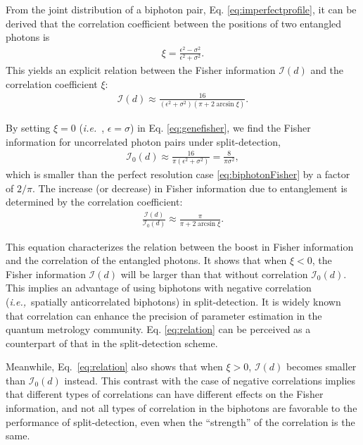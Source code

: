 From the joint distribution of a biphoton pair, Eq. \eqref{eq:imperfectprofile}, it can be derived that the correlation coefficient between the positions of two entangled photons is
\begin{align}\label{eq:genefisher}
	\xi=\frac{\epsilon ^2-\sigma ^2}{\epsilon ^2+\sigma ^2}.
\end{align}
This yields an explicit relation between the Fisher information $\mathcal{I}(d)$ and the correlation coefficient $\xi$:
\begin{align}\label{eq:Fisherinfosplit}
	\mathcal{I}(d)\approx\frac{16}{\left(\epsilon ^2+\sigma ^2\right) \left(\pi+2 \arcsin\xi \right)}.
\end{align}

By setting $\xi=0$ (\emph{i.e.}~, $\epsilon=\sigma$) in Eq. \eqref{eq:genefisher}, we find the Fisher information for uncorrelated photon pairs under split-detection,
\begin{align}\label{eq:splitUncorrelatedFisher}
	\mathcal{I}_0(d)\approx\frac{16}{\pi\left(\epsilon ^2+\sigma ^2\right)}=\frac{8}{\pi\sigma^2},
\end{align}
which is smaller than the perfect resolution case \eqref{eq:biphotonFisher} by a factor of $2/\pi$.
The increase (or decrease) in Fisher information due to entanglement is determined by the correlation coefficient:
\begin{align}\label{eq:relation}
	\frac{\mathcal{I}(d)}{\mathcal{I}_0(d)}\approx\frac{\pi}{\pi+2 \arcsin\xi }.
\end{align}

This equation characterizes the relation between the boost in Fisher information and the correlation of the entangled photons. It shows that when $\xi<0$, the Fisher information $\mathcal{I}(d)$ will be larger than that without correlation $\mathcal{I}_0(d)$. This implies an advantage of using biphotons with negative correlation (\emph{i.e.,}~spatially anticorrelated biphotons) in split-detection. It is widely known that correlation can enhance the precision of parameter estimation in the quantum metrology community. Eq. \eqref{eq:relation} can be perceived as a counterpart of that in the split-detection scheme. 

Meanwhile, Eq.~\eqref{eq:relation} also shows that when $\xi>0$, $\mathcal{I}(d)$ becomes smaller than $\mathcal{I}_0(d)$ instead. This contrast with the case of negative correlations implies that different types of correlations can have different effects on the Fisher information, and not all types of correlation in the biphotons are favorable to the performance of split-detection, even when the ``strength'' of the correlation is the same.

